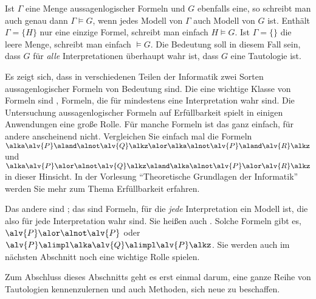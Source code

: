 Ist $\Gamma$
eine Menge aussagenlogischer Formeln und $G$
ebenfalls eine, so schreibt man auch genau dann $\Gamma\models G$,
wenn jedes Modell von $\Gamma$ auch Modell von $G$ ist.
%
Enthält $\Gamma=\{H\}$
nur eine einzige Formel, schreibt man einfach $H\models G$.
%
Ist $\Gamma=\{\}$ die leere Menge, schreibt man einfach $\models G$.
%
Die Bedeutung soll in diesem Fall sein, dass $G$
für \emph{alle} Interpretationen überhaupt wahr ist, \dh dass $G$ eine
Tautologie ist.


Es zeigt sich, dass in verschiedenen Teilen der Informatik zwei Sorten
aussagenlogischer Formeln von Bedeutung sind.
%
Die eine wichtige Klasse von Formeln sind
, \dh Formeln, die für
mindestens eine Interpretation wahr sind.
%
Die Untersuchung aussagenlogischer Formeln auf Erfüllbarkeit spielt in
einigen Anwendungen eine große Rolle.
%
Für manche Formeln ist das ganz einfach, für andere anscheinend nicht.
%
Vergleichen Sie einfach mal die Formeln
$\alka\alv{P}\aland\alnot\alv{Q}\alkz\alor\alka\alnot\alv{P}\aland\alv{R}\alkz$
und
$\alka\alv{P}\alor\alnot\alv{Q}\alkz\aland\alka\alnot\alv{P}\alor\alv{R}\alkz$
in dieser Hinsicht.
%
In der Vorlesung "`Theoretische Grundlagen der Informatik"' werden Sie
mehr zum Thema Erfüllbarkeit erfahren.

Das andere sind ;
das sind Formeln, für die \emph{jede} Interpretation ein Modell ist,
die also für jede Interpretation wahr sind.
%
Sie heißen auch .%
%
Solche Formeln gibt es, \zB $\alv{P} \alor\alnot\alv{P}$
oder $\alv{P}\alimpl\alka\alv{Q}\alimpl\alv{P}\alkz$.
%
Sie werden auch im nächsten Abschnitt noch eine wichtige Rolle spielen.

Zum Abschluss dieses Abschnitts geht es erst einmal darum, eine ganze
Reihe von Tautologien kennenzulernen und auch Methoden, sich neue zu
beschaffen.

